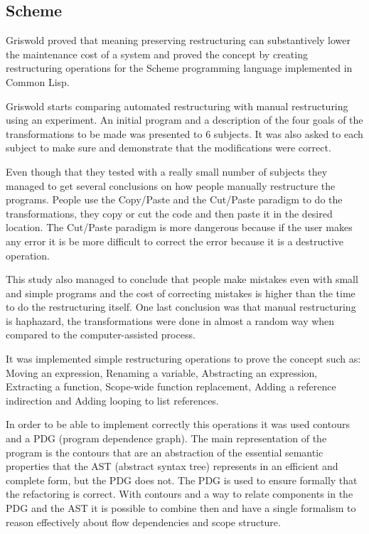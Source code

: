 
\subsection{Scheme}
Griswold \cite{griswold1991program} proved that meaning preserving restructuring can substantively lower the maintenance cost of a system and proved the concept by creating restructuring operations for the Scheme programming language implemented in Common Lisp.


Griswold starts comparing automated restructuring with manual restructuring using an experiment. 
An initial program and a description of the four goals of the transformations to be made was presented to 6 subjects. It was also asked to each subject to make sure and demonstrate that the modifications were correct.

Even though that they tested with a really small number of subjects they managed to get several conclusions on how people manually restructure the programs.
People use the Copy/Paste and the Cut/Paste paradigm to do the transformations, they copy or cut the code and then paste it in the desired location.
The Cut/Paste paradigm is more dangerous because if the user makes any error it is be more difficult to correct the error because it is a destructive operation.

This study also managed to conclude that people make mistakes even with small and simple programs and the cost of correcting mistakes is higher than the time to do the restructuring itself.
One last conclusion was that manual restructuring is haphazard, the transformations were done in almost a random way when compared to the computer-assisted process.

It was implemented simple restructuring operations to prove the concept such as: Moving an expression, Renaming a variable, Abstracting an expression, Extracting a function, Scope-wide function replacement, Adding a reference indirection and Adding looping to list references.

In order to be able to implement correctly this operations it was used contours and a PDG (program dependence graph). 
The main representation of the program is the contours that are an abstraction of the essential semantic properties that the AST (abstract syntax tree) represents in an efficient and complete form, but the PDG does not.
The PDG is used to ensure formally that the refactoring is correct.
With contours and a way to relate components in the PDG and the AST it is possible to combine then and have a single formalism to reason effectively about flow dependencies and scope structure.

